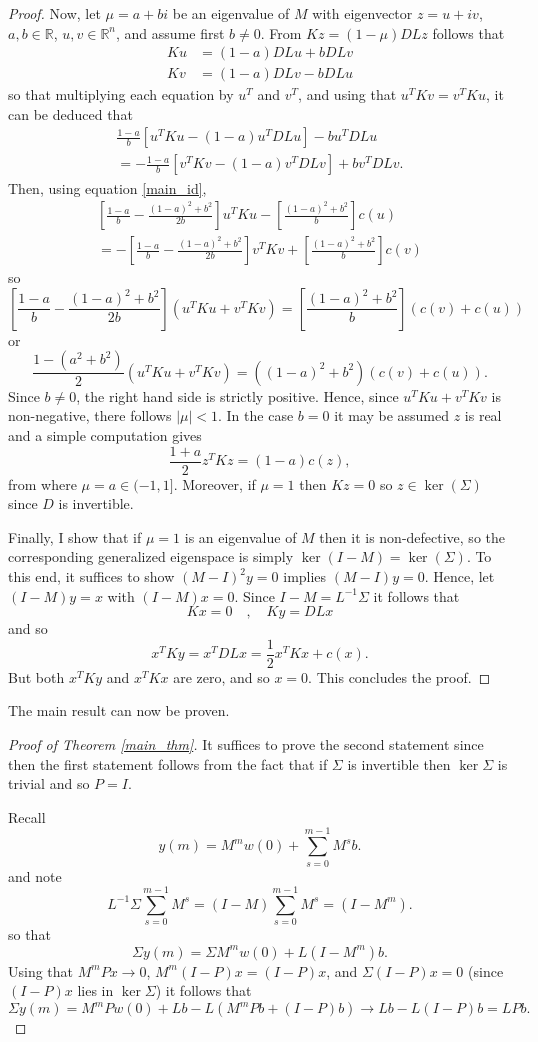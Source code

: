 \documentclass[]{interact}
\theoremstyle{plain}%
\theoremstyle{definition}
\theoremstyle{remark}
\newcommand{\abs}[1]{\left\vert#1\right\vert}
\def\R{\mathbb{R}}
\begin{document}
\begin{proof}
Now, let $\mu =a+bi$ be an eigenvalue of $M$ with eigenvector $z=u+iv$, $a,b\in \R$, $u,v\in \R^n$, and assume first $b\neq 0$.
From $Kz=(1-\mu)DLz$ follows that
\begin{align*}
Ku&=(1-a)DLu+bDLv\\
Kv&=(1-a)DLv-bDLu
\end{align*}
so that multiplying each equation by $u^T$ and $v^T$, and using that $u^TKv=v^TKu$, it can be deduced that
\begin{multline*}
\frac{1-a}{b}\left[ u^TKu-(1-a)u^TDLu\right] -bu^TDLu\\=-\frac{1-a}{b}\left[ v^TKv-(1-a)v^TDLv\right] +bv^TDLv.
\end{multline*}
Then, using equation \eqref{main_id},
\begin{multline*}
\left[ \frac{1-a}{b}-\frac{(1-a)^2+b^2}{2b}\right] u^TKu-\left[ \frac{(1-a)^2+b^2}{b}\right] c(u)
\\=
-\left[ \frac{1-a}{b}-\frac{(1-a)^2+b^2}{2b}\right] v^TKv+\left[ \frac{(1-a)^2+b^2}{b}\right] c(v)
\end{multline*}
so
\[
\left[ \frac{1-a}{b}-\frac{(1-a)^2+b^2}{2b}\right]\left( u^TKu+v^TKv\right) =\left[ \frac{(1-a)^2+b^2}{b}\right]\left( c(v)+c(u)\right) 
\]
or
\[
\frac{1-(a^2+b^2)}{2}\left( u^TKu+v^TKv\right) =((1-a)^2+b^2)\left( c(v)+c(u)\right). 
\]
Since $b\neq 0$, the right hand side is strictly positive. Hence, since $u^TKu+v^TKv$ is non-negative, there follows $\abs{\mu}< 1$. 
In the case $b=0$ it may be assumed $z$ is real and a simple computation gives
\[
\frac{1+a}{2}z^TKz=(1-a)c(z),
\]
from where $\mu=a\in (-1,1]$. Moreover, if $\mu=1$ then $Kz=0$ so $z\in \ker(\Sigma)$ since $D$ is invertible.

Finally, I show that if $\mu=1$ is an eigenvalue of $M$ then it is non-defective, so the corresponding generalized eigenspace is simply $\ker(I-M)=\ker(\Sigma)$.
To this end, it suffices to show $(M-I)^2y=0$ implies $(M-I)y=0$. Hence, let $(I-M)y=x$ with $(I-M)x=0$. Since $I-M=L^{-1}\Sigma$ it follows that
\[
 Kx=0 \quad , \quad Ky=DLx
\]
and so
\[
x^TKy=x^TDLx=\frac{1}{2}x^TKx+c(x).
\]
But both $x^TKy$ and $x^TKx$ are zero, and so $x=0$. This concludes the proof.
\end{proof}

The main result can now be proven.

\begin{proof}[Proof of Theorem \ref{main_thm}]
It suffices to prove the second statement since then the first statement follows from the fact that if $\Sigma$ is invertible then $\ker \Sigma$ is trivial and so $P=I$.

Recall 
\[
y(m)=M^mw(0)+\sum_{s=0}^{m-1}M^{s}b.
\]
and note
\[
L^{-1}\Sigma \sum_{s=0}^{m-1}M^{s}=(I-M) \sum_{s=0}^{m-1}M^s=(I-M^{m}).
\]
so that
\[
\Sigma y(m)=\Sigma M^m w(0)+L(I-M^m)b.
\]
Using that $M^m P x\rightarrow 0$, $M^m(I-P)x=(I-P)x$, and $\Sigma(I-P)x=0$ (since $(I-P)x$ lies in $\ker \Sigma$) it follows that
\[
\Sigma y(m)=M^m P w(0)+Lb-L(M^mPb+(I-P)b)\rightarrow Lb-L(I-P)b=LPb.
\]
\end{proof}
\end{document}

